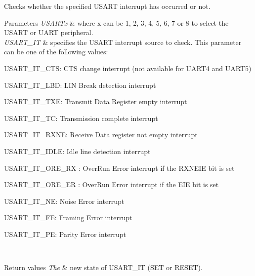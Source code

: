 Checks whether the specified U\+S\+A\+RT interrupt has occurred or not. 


\begin{DoxyParams}{Parameters}
{\em U\+S\+A\+R\+Tx} & where x can be 1, 2, 3, 4, 5, 6, 7 or 8 to select the U\+S\+A\+RT or U\+A\+RT peripheral. \\
\hline
{\em U\+S\+A\+R\+T\+\_\+\+IT} & specifies the U\+S\+A\+RT interrupt source to check. This parameter can be one of the following values\+: \begin{DoxyItemize}
\item U\+S\+A\+R\+T\+\_\+\+I\+T\+\_\+\+C\+TS\+: C\+TS change interrupt (not available for U\+A\+R\+T4 and U\+A\+R\+T5) \item U\+S\+A\+R\+T\+\_\+\+I\+T\+\_\+\+L\+BD\+: L\+IN Break detection interrupt \item U\+S\+A\+R\+T\+\_\+\+I\+T\+\_\+\+T\+XE\+: Transmit Data Register empty interrupt \item U\+S\+A\+R\+T\+\_\+\+I\+T\+\_\+\+TC\+: Transmission complete interrupt \item U\+S\+A\+R\+T\+\_\+\+I\+T\+\_\+\+R\+X\+NE\+: Receive Data register not empty interrupt \item U\+S\+A\+R\+T\+\_\+\+I\+T\+\_\+\+I\+D\+LE\+: Idle line detection interrupt \item U\+S\+A\+R\+T\+\_\+\+I\+T\+\_\+\+O\+R\+E\+\_\+\+RX \+: Over\+Run Error interrupt if the R\+X\+N\+E\+IE bit is set \item U\+S\+A\+R\+T\+\_\+\+I\+T\+\_\+\+O\+R\+E\+\_\+\+ER \+: Over\+Run Error interrupt if the E\+IE bit is set ~\newline
 \item U\+S\+A\+R\+T\+\_\+\+I\+T\+\_\+\+NE\+: Noise Error interrupt \item U\+S\+A\+R\+T\+\_\+\+I\+T\+\_\+\+FE\+: Framing Error interrupt \item U\+S\+A\+R\+T\+\_\+\+I\+T\+\_\+\+PE\+: Parity Error interrupt \end{DoxyItemize}
\\
\hline
\end{DoxyParams}

\begin{DoxyRetVals}{Return values}
{\em The} & new state of U\+S\+A\+R\+T\+\_\+\+IT (S\+ET or R\+E\+S\+ET). \\
\hline
\end{DoxyRetVals}
\mbox{\label{group___u_s_a_r_t_gaaa23b05fe0e1896bad90da7f82750831}} 
